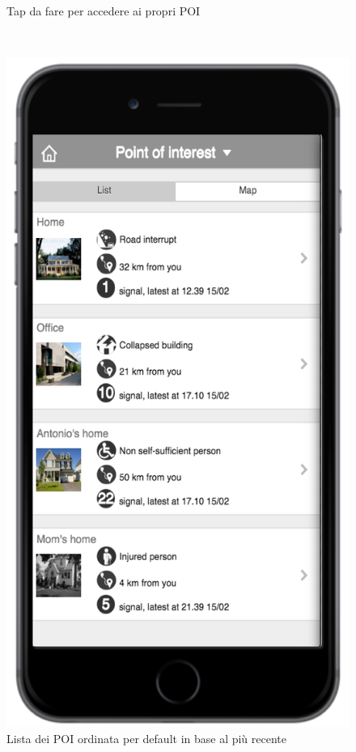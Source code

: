 \begin{figure}
\begin{minipage}[b]{6cm}
	\caption{Tap da fare per accedere ai propri POI }
	\label{fig:buttonpoi}
 \end{minipage}
 \ \hspace{6 mm} \hspace{7 mm} \
 \begin{minipage}[b]{6cm}
\centering
\includegraphics[scale=0.6]{interfaccia/poilist.png}
	\caption{Lista dei POI ordinata per default in base al più recente }
	\label{fig:poilist}
 \end{minipage}
\end{figure}


